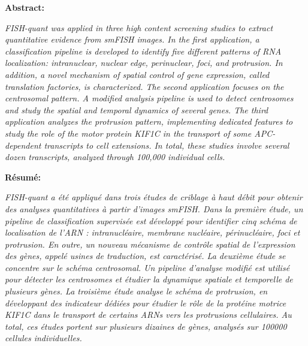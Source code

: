 
\textbf{Abstract:}
\hspace{0.5cm}

\textit{
FISH-quant was applied in three high content screening studies to extract quantitative evidence from smFISH images.
In the first application, a classification pipeline is developed to identify five different patterns of RNA localization: intranuclear, nuclear edge, perinuclear, foci, and protrusion.
In addition, a novel mechanism of spatial control of gene expression, called translation factories, is characterized.
The second application focuses on the centrosomal pattern.
A modified analysis pipeline is used to detect centrosomes and study the spatial and temporal dynamics of several genes.
The third application analyzes the protrusion pattern, implementing dedicated features to study the role of the motor protein KIF1C in the transport of some APC-dependent transcripts to cell extensions.
In total, these studies involve several dozen transcripts, analyzed through 100,000 individual cells.
}

\vspace{0.5cm}

\noindent
\textbf{Résumé:}
\hspace{0.5cm}

\textit{
FISH-quant a été appliqué dans trois études de criblage à haut débit pour obtenir des analyses quantitatives à partir d'images smFISH.
Dans la première étude, un pipeline de classification supervisée est développé pour identifier cinq schéma de localisation de l'ARN : intranucléaire, membrane nucléaire, périnucléaire, foci et protrusion.
En outre, un nouveau mécanisme de contrôle spatial de l'expression des gènes, appelé usines de traduction, est caractérisé.
La deuxième étude se concentre sur le schéma centrosomal.
Un pipeline d'analyse modifié est utilisé pour détecter les centrosomes et étudier la dynamique spatiale et temporelle de plusieurs gènes.
La troisième étude analyse le schéma de protrusion, en développant des indicateur dédiées pour étudier le rôle de la protéine motrice KIF1C dans le transport de certains ARNs vers les protrusions cellulaires.
Au total, ces études portent sur plusieurs dizaines de gènes, analysés sur 100000 cellules individuelles.
}